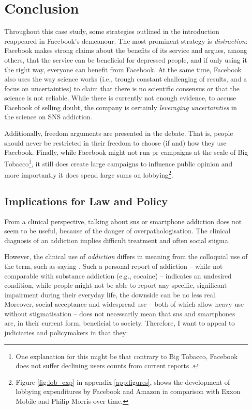 \section{Conclusion}
Throughout this case study, some strategies outlined in the introduction reappeared in Facebook's demeanour.
The most prominent strategy is \emph{distraction}:
Facebook makes strong claims about the benefits of its service and argues, among others, that the service can be beneficial for depressed people, and if only using it the right way, everyone can benefit from Facebook.
At the same time, Facebook also uses the way science works (i.e., trough constant challenging of results, and a focus on uncertainties) to claim that there is no scientific consensus or that the science is not reliable.
While there is currently not enough evidence, to accuse Facebook of selling doubt, the company is certainly \emph{leveraging uncertainties} in the science on SNS addiction.

Additionally, freedom arguments are presented in the debate.
That is, people should never be restricted in their freedom to choose (if and) how they use Facebook.
Finally, while Facebook might not run \gls{pr} campaigns at the scale of Big Tobacco\footnote{One explanation for this might be that contrary to Big Tobacco, Facebook does not suffer declining users counts from current reports  \citep{oreskes_merchants_2010, tankovska_facebook_2021}.}, it still does create large campaigns to influence public opinion and more importantly it does spend large sums on lobbying\citep{chung_big_2021}\footnote{Figure \ref{fig:lob_exp} in appendix \ref{app:figures}, shows the development of lobbying expenditures by Facebook and Amazon in comparison with Exxon Mobile and Philip Morris over time.}.

\subsection{Implications for Law and Policy}
From a clinical perspective, talking about \gls{sns} or smartphone addiction does not seem to be useful, because of the danger of overpathologisation. 
The clinical diagnosis of an addiction implies difficult treatment and often social stigma. 

However, the clinical use of \textit{addiction} differs in meaning from the colloquial use of the term, such as saying . 
Such a personal report of addiction -- while not comparable  with substance addiction (e.g., cocaine) -- indicates an undesired condition, while people might not be able to report any specific, significant impairment during their everyday life, the downside can be no less real. 
Moreover, social acceptance and widespread use -- both of which allow heavy use without stigmatisation -- does not necessarily mean that \gls{sns} and smartphones are, in their current form, beneficial to society.
Therefore, I want to appeal to judiciaries and policymakers in that they:

